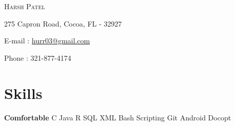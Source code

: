 \documentclass{my_resume_class}
\newcommand{\name}[1]{
   \centerline{\textsc{\huge{#1}}}
}
\newcommand{\contact}[1]{
   \centerline{\normalsize{#1}}
}
\begin{document}
\name{Harsh Patel}
\vspace{0.1cm}
\contact{275 Capron Road, Cocoa, FL - 32927}
\vspace{0.05cm}
\contact{E-mail : \href{mailto:hurr03@gmail.com}{hurr03@gmail.com}}
\vspace{0.05cm}
\contact{Phone : 321-877-4174 }

\section{Skills}
{\textbf{Comfortable}  \hspace{0.80cm} C\hspace{0.50cm} Java\hspace{0.50cm} R\hspace{0.50cm} SQL\hspace{0.50cm}  XML\hspace{0.50cm} Bash Scripting\hspace{0.50cm} Git\hspace{0.50cm} Android\hspace{0.50cm} Docopt } \\
\end{document}
